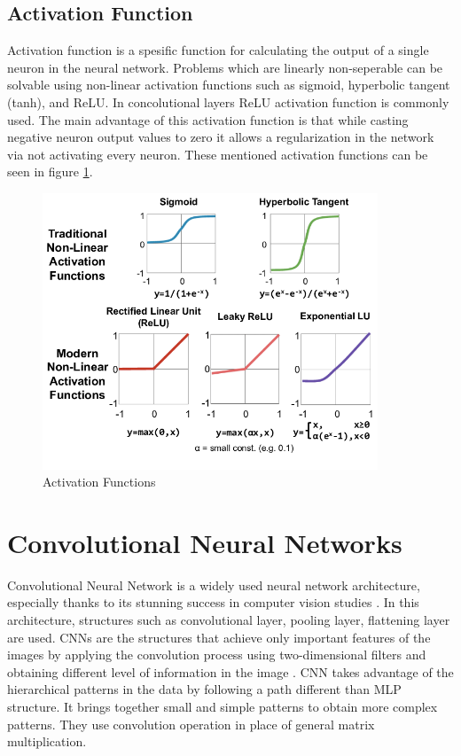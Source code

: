 \subsection{Activation Function}

Activation function is a spesific function for calculating the output of a single neuron in the neural network. Problems which are linearly non-seperable can be solvable using non-linear activation functions such as sigmoid, hyperbolic tangent (tanh), and ReLU. In concolutional layers ReLU activation function is commonly used. The main advantage of this activation function is that while casting negative neuron output values to zero it allows a regularization in the network via not activating every neuron. These mentioned activation functions can be seen in figure \ref{fig:activation_functions}.

\begin{figure}[h]
    \centering
    \includegraphics[width=10cm]{figures/chapter3/activation_functions.png}
    \caption{Activation Functions \cite{activation_functions}}
    \label{fig:activation_functions}
\end{figure}

\section{Convolutional Neural Networks}

Convolutional Neural Network is a widely used neural network architecture, especially thanks to its stunning success in computer vision studies \cite{leNet}. In this architecture, structures such as convolutional layer, pooling layer, flattening layer are used. CNNs are the structures that achieve only important features of the images by applying the convolution process using two-dimensional filters and obtaining different level of information in the image \cite{CNN_review}. CNN takes advantage of the hierarchical patterns in the data by following a path different than MLP structure. It brings together small and simple patterns to obtain more complex patterns. They use convolution operation in place of general matrix multiplication.

